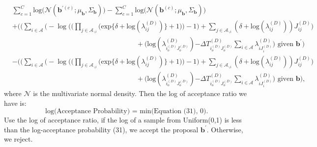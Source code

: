 \documentclass[a4paper]{article}
\begin{document}
   \begin{equation}
   \begin{aligned} 
   &\sum_{c=1}^C\mbox{log}\Big(\mathcal{N}(\boldsymbol{b}^{\prime(c)};\mu_{\boldsymbol{b}}, \Sigma_{\boldsymbol{b}})\Big)-\sum_{c=1}^C\mbox{log}\Big(\mathcal{N}(\boldsymbol{b}^{(c)};\mu_{\boldsymbol{b}}, \Sigma_{\boldsymbol{b}})\Big)\\&+ \Bigg(\Big(\sum_{i\in \mathcal{A}}\Big(-\log\Big(\Big(\prod_{j \in \mathcal{A}_{\backslash i}} \Big(\mbox{exp}\{\delta+\mbox{log}(\lambda_{ij}^{(D)})\} + 1\Big)\Big)-1\Big) + \sum_{j \in \mathcal{A}_{\backslash i}} (\delta+\mbox{log}(\lambda_{ij}^{(D)}))J_{ij}^{(D)}\Big)\\&\quad\quad\quad\quad\quad\quad\quad\quad\quad\quad\quad\quad\quad\quad\quad\quad\quad\quad +  \Big(\mbox{log}(\lambda^{(D)}_{i_o^{(D)}J_o^{(D)}}){ - \Delta T^{(D)}_{i_o^{(D)}J_o^{(D)}}\sum\limits_{i \in \mathcal{A}}\lambda^{(D)}_{i{J_i^{(D)}}}} \Big)\mbox{ given }  \boldsymbol{b}^\prime\Bigg)
   \\& -\Bigg(\Big(\sum_{i\in \mathcal{A}}\Big(-\log\Big(\Big(\prod_{j \in \mathcal{A}_{\backslash i}} \Big(\mbox{exp}\{\delta+\mbox{log}(\lambda_{ij}^{(D)})\} + 1\Big)\Big)-1\Big) + \sum_{j \in \mathcal{A}_{\backslash i}} (\delta+\mbox{log}(\lambda_{ij}^{(D)}))J_{ij}^{(D)}\Big)\\&\quad\quad\quad\quad\quad\quad\quad\quad\quad\quad\quad\quad\quad\quad\quad\quad\quad\quad +  \Big(\mbox{log}(\lambda^{(D)}_{i_o^{(D)}J_o^{(D)}}){ - \Delta T^{(D)}_{i_o^{(D)}J_o^{(D)}}\sum\limits_{i \in \mathcal{A}}\lambda^{(D)}_{i{J_i^{(D)}}}} \Big)\mbox{ given }  \boldsymbol{b}\Bigg),
   \end{aligned}
   \end{equation}
   where $\mathcal{N}$ is the multivariate normal density. Then the log of acceptance ratio we have is:
   \begin{equation}
   \mbox{log(Acceptance Probability) = min(Equation (31), 0). }
   \end{equation}
   Use the log of acceptance ratio, if the log of a sample from Uniform(0,1) is less than the log-acceptance probability (31), we accept the proposal $\boldsymbol{b}^\prime$. Otherwise, we reject.
\end{document}
